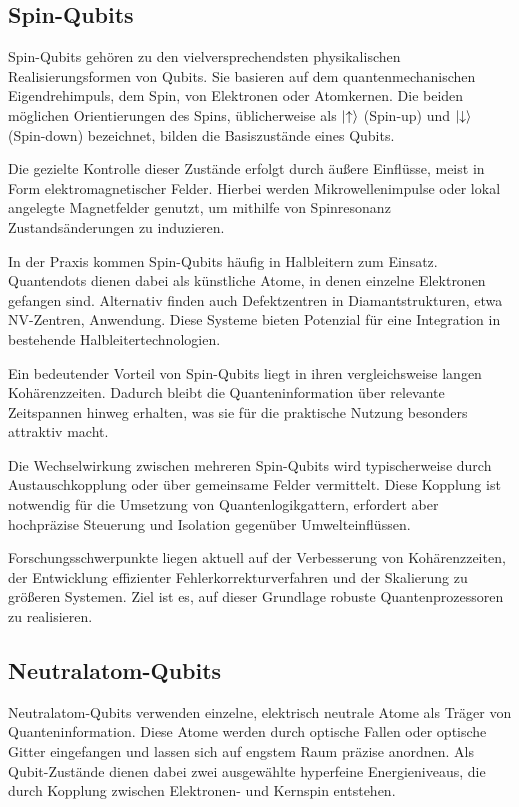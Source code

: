 \cite{nielsen_michael_a_and_isaac_l_chuang_quantum_2010}









\subsection{Spin-Qubits}
Spin-Qubits gehören zu den vielversprechendsten physikalischen Realisierungsformen von Qubits. Sie basieren auf dem quantenmechanischen Eigendrehimpuls, dem Spin, von Elektronen oder Atomkernen. Die beiden möglichen Orientierungen des Spins, üblicherweise als $\ket{\uparrow}$ (Spin-up) und $\ket{\downarrow}$ (Spin-down) bezeichnet, bilden die Basiszustände eines Qubits.

Die gezielte Kontrolle dieser Zustände erfolgt durch äußere Einflüsse, meist in Form elektromagnetischer Felder. Hierbei werden Mikrowellenimpulse oder lokal angelegte Magnetfelder genutzt, um mithilfe von Spinresonanz Zustandsänderungen zu induzieren.

In der Praxis kommen Spin-Qubits häufig in Halbleitern zum Einsatz. Quantendots dienen dabei als künstliche Atome, in denen einzelne Elektronen gefangen sind. Alternativ finden auch Defektzentren in Diamantstrukturen, etwa NV-Zentren, Anwendung. Diese Systeme bieten Potenzial für eine Integration in bestehende Halbleitertechnologien.

Ein bedeutender Vorteil von Spin-Qubits liegt in ihren vergleichsweise langen Kohärenzzeiten. Dadurch bleibt die Quanteninformation über relevante Zeitspannen hinweg erhalten, was sie für die praktische Nutzung besonders attraktiv macht.

Die Wechselwirkung zwischen mehreren Spin-Qubits wird typischerweise durch Austauschkopplung oder über gemeinsame Felder vermittelt. Diese Kopplung ist notwendig für die Umsetzung von Quantenlogikgattern, erfordert aber hochpräzise Steuerung und Isolation gegenüber Umwelteinflüssen.

Forschungsschwerpunkte liegen aktuell auf der Verbesserung von Kohärenzzeiten, der Entwicklung effizienter Fehlerkorrekturverfahren und der Skalierung zu größeren Systemen. Ziel ist es, auf dieser Grundlage robuste Quantenprozessoren zu realisieren.

\subsection{Neutralatom-Qubits}
Neutralatom-Qubits verwenden einzelne, elektrisch neutrale Atome als Träger von Quanteninformation. Diese Atome werden durch optische Fallen oder optische Gitter eingefangen und lassen sich auf engstem Raum präzise anordnen. Als Qubit-Zustände dienen dabei zwei ausgewählte hyperfeine Energieniveaus, die durch Kopplung zwischen Elektronen- und Kernspin entstehen.

